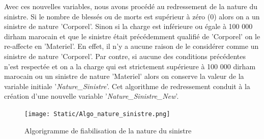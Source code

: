 Avec ces nouvelles variables, nous avons proc\'ed\'e au redressement de la nature du sinistre. Si le nombre de bless\'es ou de morts est sup\'erieur \`a z\'ero (0) alors on a un sinistre de nature 'Corporel'. Sinon si la charge est inf\'erieure ou \'egale \`a 100 000 dirham marocain et que le sinistre \'etait pr\'ec\'edemment qualifi\'e de 'Corporel' on le re-affecte en 'Materiel'. En effet, il n'y a aucune raison de le considérer comme un sinistre de nature 'Corporel'. Par contre, si aucune des conditions pr\'ec\'edentes n'est respect\'ee et on a la charge qui est strictement sup\'erieure \`a 100 000 dirham marocain ou un sinistre de nature 'Materiel' alors on conserve la valeur de la variable initiale '\textit{Nature\_Sinistre}'. Cet algorithme de redressement conduit \`a la cr\'eation d'une nouvelle variable '\textit{Nature\_Sinistre\_New}'.
\begin{figure}[H]
    \begin{center}
      \texttt{[image: Static/Algo\_nature\_sinistre.png]} 
      \end{center}
        \caption{Algorigramme de fiabilisation de la nature du sinistre}  \label{fig:xray}
\end{figure}

